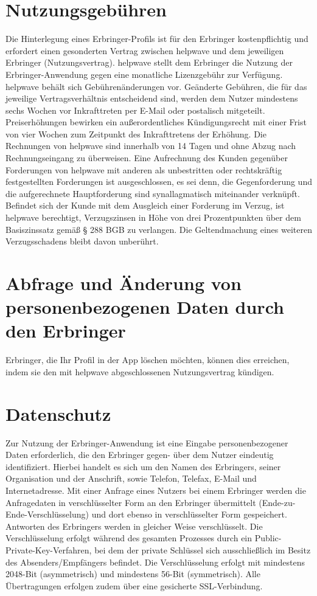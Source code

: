 \documentclass[10pt]{article}
\begin{document}
\section{Nutzungsgebühren}
Die Hinterlegung eines Erbringer-Profils ist für den Erbringer kostenpflichtig und erfordert einen gesonderten Vertrag
zwischen helpwave und dem jeweiligen Erbringer (Nutzungsvertrag).
helpwave stellt dem Erbringer die Nutzung der Erbringer-Anwendung gegen eine monatliche Lizenzgebühr zur Verfügung. helpwave behält sich Gebührenänderungen vor. Geänderte Gebühren, die für das jeweilige Vertragsverhältnis entscheidend sind, werden dem Nutzer mindestens sechs Wochen vor Inkrafttreten per E-Mail oder postalisch mitgeteilt. Preiserhöhungen bewirken ein außerordentliches Kündigungsrecht mit einer Frist von vier Wochen zum Zeitpunkt des Inkrafttretens der Erhöhung. Die Rechnungen von helpwave sind innerhalb von 14 Tagen und ohne Abzug nach Rechnungseingang zu überweisen. Eine Aufrechnung des Kunden gegenüber Forderungen von helpwave mit anderen als unbestritten oder rechtskräftig festgestellten Forderungen ist ausgeschlossen, es sei denn, die Gegenforderung und die aufgerechnete Hauptforderung sind synallagmatisch miteinander verknüpft. Befindet sich der Kunde mit dem Ausgleich einer Forderung im Verzug, ist helpwave berechtigt, Verzugszinsen in Höhe von drei Prozentpunkten über dem Basiszinssatz gemäß § 288 BGB zu verlangen. Die Geltendmachung eines weiteren Verzugsschadens bleibt davon unberührt.


\section{Abfrage und Änderung von personenbezogenen Daten durch den Erbringer}
Erbringer, die Ihr Profil in der App löschen möchten, können dies erreichen, indem sie den mit helpwave abgeschlossenen
Nutzungsvertrag kündigen.

\section{Datenschutz}
Zur Nutzung der Erbringer-Anwendung ist eine Eingabe personenbezogener Daten erforderlich, die den Erbringer gegen-
über dem Nutzer eindeutig identifiziert. Hierbei handelt es sich um den Namen des Erbringers, seiner Organisation und der
Anschrift, sowie Telefon, Telefax, E-Mail und Internetadresse.
Mit einer Anfrage eines Nutzers bei einem Erbringer werden die Anfragedaten in verschlüsselter Form an den Erbringer
übermittelt (Ende-zu-Ende-Verschlüsselung) und dort ebenso in verschlüsselter Form gespeichert. Antworten des Erbringers werden in gleicher Weise verschlüsselt. Die Verschlüsselung erfolgt während des gesamten Prozesses durch ein Public-
Private-Key-Verfahren, bei dem der private Schlüssel sich ausschließlich im Besitz des Absenders/Empfängers befindet. Die
Verschlüsselung erfolgt mit mindestens 2048-Bit (asymmetrisch) und mindestens 56-Bit (symmetrisch). Alle Übertragungen
erfolgen zudem über eine gesicherte SSL-Verbindung. \\
\end{document}
